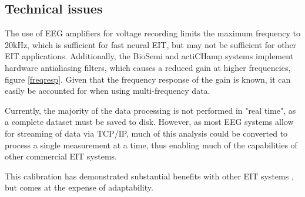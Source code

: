 \subsection{Technical issues}
The use of EEG amplifiers for voltage recording limits the maximum frequency to 20kHz, which is sufficient for fast neural EIT, but may not be sufficient for other EIT applications. Additionally, the BioSemi and actiCHamp systems implement hardware antialiasing filters, which causes a reduced gain at higher frequencies, figure \ref{freqresp}. Given that the frequency response of the gain is known, it can easily be accounted for when using multi-frequency data.

Currently, the majority of the data processing is not performed in "real time", as a complete dataset must be saved to disk. However, as most EEG systems allow for streaming of data via TCP/IP, much of this analysis could be converted to process a single measurement at a time, thus enabling much of the capabilities of other commercial EIT systems.

This calibration has demonstrated substantial benefits with other EIT systems \cite{Hun_Wi_2014} \cite{khan}, but comes at the expense of adaptability.